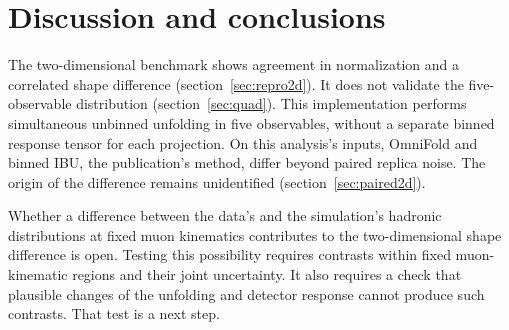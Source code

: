 

\section{Discussion and conclusions}
\label{sec:conclusions}

The two-dimensional benchmark shows agreement in normalization and a correlated shape difference (section~\ref{sec:repro2d}). It does not validate the five-observable distribution (section~\ref{sec:quad}). This implementation performs simultaneous unbinned unfolding in five observables, without a separate binned response tensor for each projection. On this analysis's inputs, OmniFold and binned IBU, the publication's method, differ beyond paired replica noise. The origin of the difference remains unidentified (section~\ref{sec:paired2d}).

Whether a difference between the data's and the simulation's hadronic distributions at fixed muon kinematics contributes to the two-dimensional shape difference is open. Testing this possibility requires contrasts within fixed muon-kinematic regions and their joint uncertainty. It also requires a check that plausible changes of the unfolding and detector response cannot produce such contrasts. That test is a next step.

